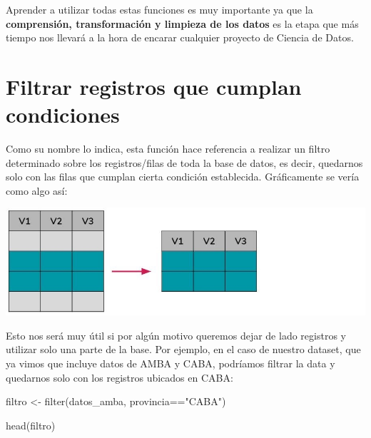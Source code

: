 \documentclass[
  spanish,
]{book}
\newenvironment{Shaded}{\begin{snugshade}}{\end{snugshade}}
\newcommand{\FunctionTok}[1]{\textcolor[rgb]{0.00,0.00,0.00}{#1}}
\newcommand{\NormalTok}[1]{#1}
\newcommand{\OtherTok}[1]{\textcolor[rgb]{0.56,0.35,0.01}{#1}}
\newcommand{\SpecialCharTok}[1]{\textcolor[rgb]{0.00,0.00,0.00}{#1}}
\newcommand{\StringTok}[1]{\textcolor[rgb]{0.31,0.60,0.02}{#1}}
\begin{document}
Aprender a utilizar todas estas funciones es muy importante ya que la \textbf{comprensión, transformación y limpieza de los datos} es la etapa que más tiempo nos llevará a la hora de encarar cualquier proyecto de Ciencia de Datos.

\hypertarget{filtrar-registros-que-cumplan-condiciones}{%
\section{Filtrar registros que cumplan condiciones}\label{filtrar-registros-que-cumplan-condiciones}}

Como su nombre lo indica, esta función hace referencia a realizar un filtro determinado sobre los registros/filas de toda la base de datos, es decir, quedarnos solo con las filas que cumplan cierta condición establecida. Gráficamente se vería como algo así:

\includegraphics{images/tidyverse_filtrar.jpg}

Esto nos será muy útil si por algún motivo queremos dejar de lado registros y utilizar solo una parte de la base. Por ejemplo, en el caso de nuestro dataset, que ya vimos que incluye datos de AMBA y CABA, podríamos filtrar la data y quedarnos solo con los registros ubicados en CABA:

\begin{Shaded}
\begin{Highlighting}[]
\NormalTok{filtro }\OtherTok{\textless{}{-}} \FunctionTok{filter}\NormalTok{(datos\_amba, provincia}\SpecialCharTok{==}\StringTok{"CABA"}\NormalTok{)}

\FunctionTok{head}\NormalTok{(filtro)}
\end{Highlighting}
\end{Shaded}
\end{document}
